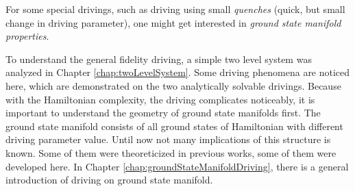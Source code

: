 For some special drivings, such as driving using small \emph{quenches} (quick, but small change in driving parameter), one might get interested in \emph{ground state manifold properties}.

To understand the general fidelity driving, a simple two level system was analyzed in Chapter \ref{chap:twoLevelSystem}. Some driving phenomena are noticed here, which are demonstrated on the two analytically solvable drivings. Because with the Hamiltonian complexity, the driving complicates noticeably, it is important to understand the geometry of ground state manifolds first. The ground state manifold consists of all ground states of Hamiltonian with different driving parameter value. Until now not many implications of this structure is known. Some of them were theoreticized in previous works, some of them were developed here. In Chapter \ref{chap:groundStateManifoldDriving}, there is a general introduction of driving on ground state manifold. 
